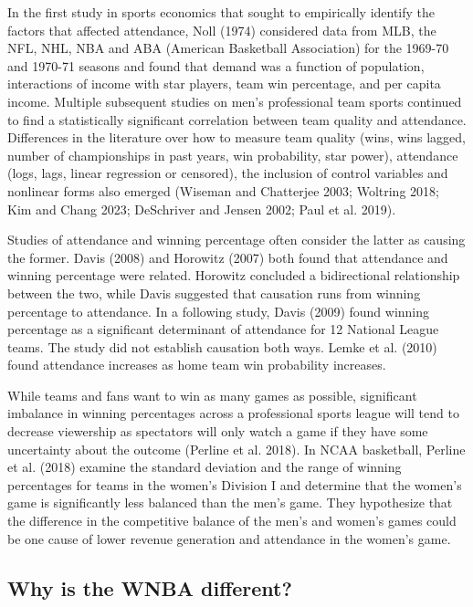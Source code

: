 \documentclass[
  letterpaper,
  DIV=11,
  numbers=noendperiod]{scrartcl}
\begin{document}
In the first study in sports economics that sought to empirically
identify the factors that affected attendance, Noll (1974) considered
data from MLB, the NFL, NHL, NBA and ABA (American Basketball
Association) for the 1969-70 and 1970-71 seasons and found that demand
was a function of population, interactions of income with star players,
team win percentage, and per capita income. Multiple subsequent studies
on men's professional team sports continued to find a statistically
significant correlation between team quality and attendance. Differences
in the literature over how to measure team quality (wins, wins lagged,
number of championships in past years, win probability, star power),
attendance (logs, lags, linear regression or censored), the inclusion of
control variables and nonlinear forms also emerged (Wiseman and
Chatterjee 2003; Woltring 2018; Kim and Chang 2023; DeSchriver and
Jensen 2002; Paul et al. 2019).

Studies of attendance and winning percentage often consider the latter
as causing the former. Davis (2008) and Horowitz (2007) both found that
attendance and winning percentage were related. Horowitz concluded a
bidirectional relationship between the two, while Davis suggested that
causation runs from winning percentage to attendance. In a following
study, Davis (2009) found winning percentage as a significant
determinant of attendance for 12 National League teams. The study did
not establish causation both ways. Lemke et al. (2010) found attendance
increases as home team win probability increases.

While teams and fans want to win as many games as possible, significant
imbalance in winning percentages across a professional sports league
will tend to decrease viewership as spectators will only watch a game if
they have some uncertainty about the outcome (Perline et al. 2018). In
NCAA basketball, Perline et al. (2018) examine the standard deviation
and the range of winning percentages for teams in the women's Division I
and determine that the women's game is significantly less balanced than
the men's game. They hypothesize that the difference in the competitive
balance of the men's and women's games could be one cause of lower
revenue generation and attendance in the women's game.

\subsection{Why is the WNBA different?}\label{why-is-the-wnba-different}
\end{document}
